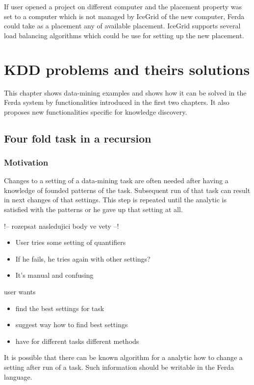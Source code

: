 \documentclass[a4paper,12pt]{book}
\begin{document}
If user opened a project on different computer and the placement property was set to a computer which is not managed by IceGrid of the new computer, Ferda could take as a placement any of available placement. IceGrid supports several load balancing algorithms which could be use for setting up the new placement.

\chapter{KDD problems and theirs solutions}
\label{chap:KDDExamples}
This chapter shows data-mining examples and shows how it can be solved in the Ferda system by functionalities introduced in the first two chapters. It also proposes new functionalities specific for knowledge discovery.

\section{Four fold task in a recursion}
\subsection{Motivation}
Changes to a setting of a data-mining task are often needed after having a knowledge of founded patterns of the task. Subsequent run of that task can result in next changes of that settings. This step is repeated until the analytic is satisfied with the patterns or he gave up that setting at all.


!-- rozepsat nasledujici body ve vety --!

\begin{itemize}
			\item User tries some setting of quantifiers
			\item If he fails, he tries again with other settings?
			\item It's manual and confusing
\end{itemize}
		user wants
		\begin{itemize}
			\item find the best settings for task
			\item suggest way how to find best settings
			\item have for different tasks different methods
		\end{itemize}

It is possible that there can be known algorithm for a analytic how to change a setting after run of a task. Such information should be writable in the Ferda language.
\end{document}
